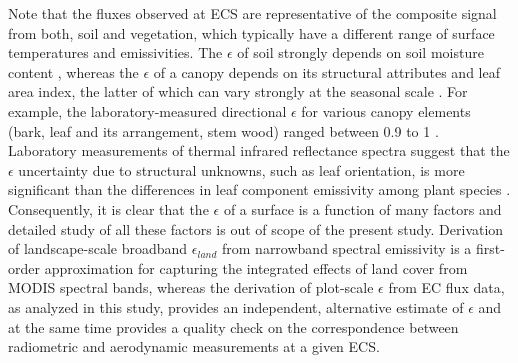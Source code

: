 \documentclass[fleqn,10pt]{wlscirep}
\begin{document}
Note that the fluxes observed at ECS are representative of the composite signal from both, soil and vegetation, which typically have a different range of surface temperatures and emissivities\cite{jin2006improved}. The $\epsilon$ of soil strongly depends on soil moisture content \cite{mira2007influence}, whereas the $\epsilon$ of a canopy depends on its structural attributes and leaf area index, the latter of which can vary strongly at the seasonal scale \cite{chen2015determining}. For example, the laboratory-measured directional $\epsilon$ for various canopy elements (bark, leaf and its arrangement, stem wood) ranged between 0.9 to 1 \cite{vishnevetsky2019method}. Laboratory measurements of thermal infrared reflectance spectra suggest that the $\epsilon$ uncertainty due to structural unknowns, such as leaf orientation, is more significant than the differences in leaf component emissivity among plant species \cite{snyder1998classification}. Consequently, it is clear that the $\epsilon$ of a surface is a function of many factors and detailed study of all these factors is out of scope of the present study. Derivation of landscape-scale broadband $\epsilon_{land}$ from narrowband spectral emissivity is a first-order approximation for capturing the integrated effects of land cover from MODIS spectral bands\cite{jin2006improved}, whereas the derivation of plot-scale $\epsilon$ from EC flux data, as analyzed in this study, provides an independent, alternative estimate of $\epsilon$ and at the same time provides a quality check on the correspondence between radiometric and aerodynamic measurements at a given ECS.
\end{document}
